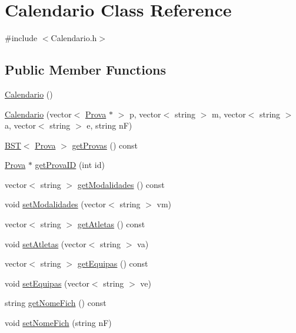 \hypertarget{class_calendario}{}\section{Calendario Class Reference}
\label{class_calendario}


{\ttfamily \#include $<$Calendario.\+h$>$}

\subsection*{Public Member Functions}
\begin{DoxyCompactItemize}
\item 
\hyperlink{class_calendario_a2aa60aa6d3c27f696018cc09d2748ea5}{Calendario} ()
\item 
\hyperlink{class_calendario_aed6e937e701548fcd80f9c154232a358}{Calendario} (vector$<$ \hyperlink{class_prova}{Prova} $\ast$ $>$ p, vector$<$ string $>$ m, vector$<$ string $>$ a, vector$<$ string $>$ e, string n\+F)
\item 
\hyperlink{class_b_s_t}{B\+S\+T}$<$ \hyperlink{class_prova}{Prova} $>$ \hyperlink{class_calendario_ab5348c3d8e2126ae2ed0166090e72e55}{get\+Provas} () const 
\item 
\hyperlink{class_prova}{Prova} $\ast$ \hyperlink{class_calendario_a70c19efe918a727f0838e3fd94391230}{get\+Prova\+I\+D} (int id)
\item 
vector$<$ string $>$ \hyperlink{class_calendario_aa92791918d953f34250063a67d0d6232}{get\+Modalidades} () const 
\item 
void \hyperlink{class_calendario_a7cb27d11676ca4fc42704be917469605}{set\+Modalidades} (vector$<$ string $>$ vm)
\item 
vector$<$ string $>$ \hyperlink{class_calendario_abfc38a3a96e33ec237496ed83c3259a5}{get\+Atletas} () const 
\item 
void \hyperlink{class_calendario_aa9691cb641df0e63197445f891e763a7}{set\+Atletas} (vector$<$ string $>$ va)
\item 
vector$<$ string $>$ \hyperlink{class_calendario_aff13d470983e46172aca04dda560332d}{get\+Equipas} () const 
\item 
void \hyperlink{class_calendario_a231a630e1b58f9637814169f8b5364fe}{set\+Equipas} (vector$<$ string $>$ ve)
\item 
string \hyperlink{class_calendario_a8ec3b8d1862fc893922561d97e4341cb}{get\+Nome\+Fich} () const 
\item 
void \hyperlink{class_calendario_af538ad94515f132774b870a9bfc2a01d}{set\+Nome\+Fich} (string n\+F)

\end{DoxyCompactItemize}
